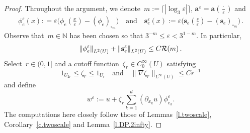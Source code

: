 \documentclass[11pt]{article} %
\let\oldsquare\square %
\renewcommand{\square}{\oldsquare}
\numberwithin{equation}{section}
\theoremstyle{definition}
\let\originalleft\left
\let\originalright\right
\renewcommand{\left}{\mathopen{}\mathclose\bgroup\originalleft}
\renewcommand{\right}{\aftergroup\egroup\originalright}
\newcommand*{\N}{\ensuremath{\mathbb{N}}}
\newcommand{\eps}{\varepsilon}
\newcommand{\s}{\mathbf{s}}
\newcommand{\ep}{\eps}
\renewcommand{\a}{\mathbf{a}}
\newcommand{\cu}{\square}
\newcommand{\indc}{1}
\begin{document}
\begin{proof}
Throughout the argument, we denote~$m:= \lceil |\log_3 \ep| \rceil$, $\a^\ep =  \a(\tfrac \cdot\ep)$ and
\begin{align*}
\phi_{e}^\ep (x) : = \ep \bigl(  \phi_{e}(\tfrac x\ep) - ( \phi_{e} )_{\cu_m} \bigr)
\quad \mbox{and} \quad
\s_{e}^\ep(x) := \ep \bigl( \s_{e}(\tfrac s\ep) - ( \s_{e} )_{\cu_m} \bigr)
\,.
\end{align*}
Observe that~$m\in\N$ has been chosen so that $3^{-m} \leq \ep < 3^{1-m}$. In particular, 
\begin{align*}
\left\| \phi_e^\ep \right\|_{L^2(U)} + \left\| \s_e^\ep \right\|_{L^2(U)} 
\leq C\mathcal{R}(m)
\,.
\end{align*}
Select~$r\in (0,1]$ and a cutoff function~$\zeta_r \in C_0^\infty(U)$ satisfying
\begin{equation}
\label{e.zetar.cut.off}
\indc_{U_{2r}} \leq \zeta_r \leq \indc_{U_{r}}
\quad \mbox{and} \quad 
\| \nabla \zeta_r \|_{L^\infty(U)} \leq C r^{-1}
\end{equation}
and define
\begin{equation}
\label{e.wepdef}
w^\ep  :=
u +  \zeta_r \sum_{k=1}^d (\partial_{x_k}u) \phi_{e_k}^\ep .
\end{equation}
The computations here closely follow those of Lemmas~\ref{l.twoscale}, Corollary~\ref{c.twoscale} and Lemma~\ref{l.DP.2infty}. 

\smallskip


\end{proof}
\end{document}
